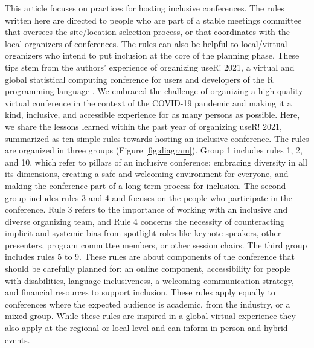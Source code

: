 \documentclass[10pt,letterpaper]{article}
\begin{document}
This article focuses on practices for hosting inclusive conferences.
The rules written here are directed to people who are part of a stable meetings committee that oversees the site/location selection process, or that coordinates with the local organizers of conferences.
The rules can also be helpful to local/virtual organizers who intend to put inclusion at the core of the planning phase.
These tips stem from the authors' experience of organizing useR! 2021, a virtual and global statistical computing conference for users and developers of the R programming language \cite{r_core_team_2021}. 
We embraced the challenge of organizing a high-quality virtual conference in the context of the COVID-19 pandemic and making it a kind, inclusive, and accessible experience for as many persons as possible. 
Here, we share the lessons learned within the past year of organizing useR! 2021, summarized as ten simple rules towards hosting an inclusive conference.
The rules are organized in three groups (Figure \ref{fig:diagram}). %
Group 1 includes rules 1, 2, and 10, which refer to pillars of an inclusive conference: embracing diversity in all its dimensions, creating a safe and welcoming environment for everyone, and making the conference part of a long-term process for inclusion.
The second group includes rules 3 and 4 and focuses on the people who participate in the conference. 
Rule 3 refers to the importance of working with an inclusive and diverse organizing team, and Rule 4 concerns the necessity of counteracting implicit and systemic bias from spotlight roles like keynote speakers, other presenters, program committee members, or other session chairs. 
The third group includes rules 5 to 9. These rules are about components of the conference that should be carefully planned for: an online component, accessibility for people with disabilities, language inclusiveness, a welcoming communication strategy, and financial resources to support inclusion. 
These rules apply equally to conferences where the expected audience is academic, from the industry, or a mixed group. While these rules are inspired in a global virtual experience they also apply at the regional or local level and can inform in-person and hybrid events.
\end{document}
